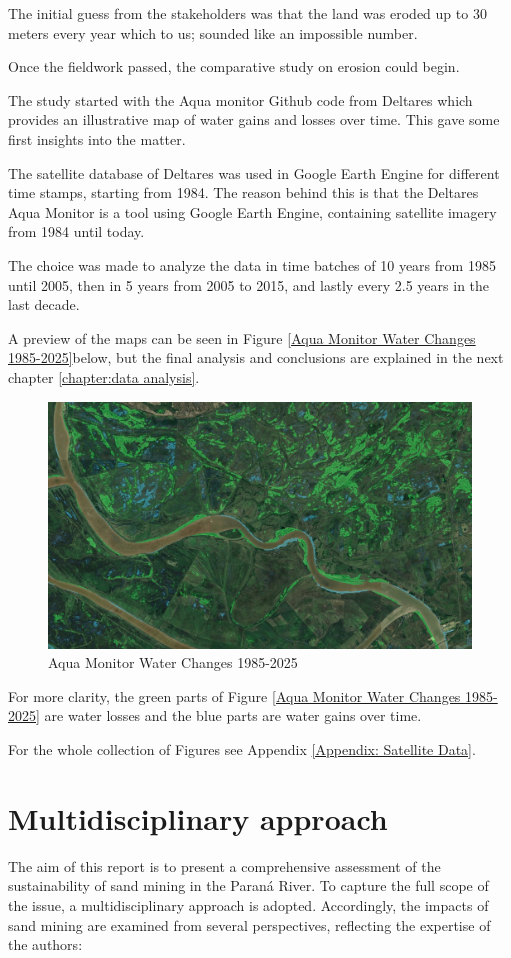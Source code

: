 The initial guess from the stakeholders was that the land was eroded up to 30 meters every year which to us; sounded like an impossible number.

Once the fieldwork passed, the comparative study on erosion could begin.

The study started with the Aqua monitor Github code from Deltares which provides an illustrative map of water gains and losses over time. This gave some first insights into the matter.

The satellite database of Deltares was used in Google Earth Engine for different time stamps, starting from 1984. The reason behind this is that the Deltares Aqua Monitor is a tool using Google Earth Engine, containing satellite imagery from 1984 until today. 
 
The choice was made to analyze the data in time batches of 10 years from 1985 until 2005, then in 5 years from 2005 to 2015, and lastly every 2.5 years in the last decade.

A preview of the maps can be seen in Figure \ref{Aqua Monitor Water Changes 1985-2025}below, but the final analysis and conclusions are explained in the next chapter \ref{chapter:data analysis}. 

\begin{figure}[H]
    \centering
    \includegraphics[width=0.75\linewidth]{figures/ch4/1985-2025.jpg}
    \caption{Aqua Monitor Water Changes 1985-2025}
\end{figure}
\label{Aqua Monitor Water Changes 1985-2025}

For more clarity, the green parts of Figure \ref{Aqua Monitor Water Changes 1985-2025} are water losses and the blue parts are water gains over time.


For the whole collection of Figures see Appendix \ref{Appendix: Satellite Data}.


\section{Multidisciplinary approach}
The aim of this report is to present a comprehensive assessment of the sustainability of sand mining in the Paraná River. To capture the full scope of the issue, a multidisciplinary approach is adopted. Accordingly, the impacts of sand mining are examined from several perspectives, reflecting the expertise of the authors:

